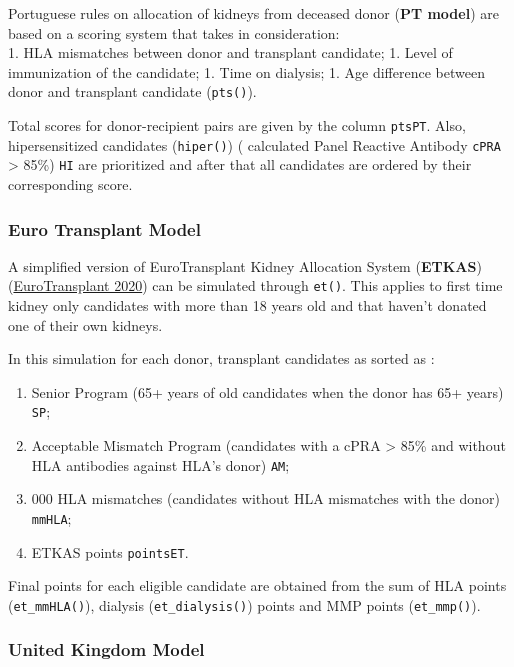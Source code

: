 \documentclass[
]{article}
\providecommand{\tightlist}{%
  \setlength{\itemsep}{0pt}\setlength{\parskip}{0pt}}
\begin{document}
Portuguese rules on allocation of kidneys from deceased donor
(\textbf{PT model}) are based on a scoring system that takes in
consideration:\\
1. HLA mismatches between donor and transplant candidate; 1. Level of
immunization of the candidate; 1. Time on dialysis; 1. Age difference
between donor and transplant candidate (\texttt{pts()}).

Total scores for donor-recipient pairs are given by the column
\texttt{ptsPT}. Also, hipersensitized candidates (\texttt{hiper()}) (
calculated Panel Reactive Antibody \texttt{cPRA} \textgreater{} 85\%)
\texttt{HI} are prioritized and after that all candidates are ordered by
their corresponding score.

\hypertarget{euro-transplant-model}{%
\subsubsection{Euro Transplant Model}\label{euro-transplant-model}}

A simplified version of EuroTransplant Kidney Allocation System
(\textbf{ETKAS}) (\protect\hyperlink{ref-ET}{EuroTransplant 2020}) can
be simulated through \texttt{et()}. This applies to first time kidney
only candidates with more than 18 years old and that haven't donated one
of their own kidneys.

In this simulation for each donor, transplant candidates as sorted as :

\begin{enumerate}
\def\labelenumi{\arabic{enumi}.}
\tightlist
\item
  Senior Program (65+ years of old candidates when the donor has 65+
  years) \texttt{SP};
\item
  Acceptable Mismatch Program (candidates with a cPRA \textgreater{}
  85\% and without HLA antibodies against HLA's donor) \texttt{AM};
\item
  000 HLA mismatches (candidates without HLA mismatches with the donor)
  \texttt{mmHLA};
\item
  ETKAS points \texttt{pointsET}.
\end{enumerate}

Final points for each eligible candidate are obtained from the sum of
HLA points (\texttt{et\_mmHLA()}), dialysis (\texttt{et\_dialysis()})
points and MMP points (\texttt{et\_mmp()}).

\hypertarget{united-kingdom-model}{%
\subsubsection{United Kingdom Model}\label{united-kingdom-model}}
\end{document}
